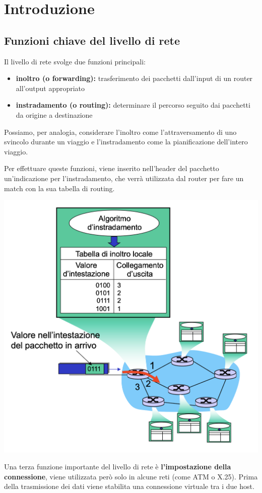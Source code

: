 \documentclass{report}
\begin{document}
	\hypertarget{header-n0}{%
\section{Introduzione}\label{header-n0}}

\hypertarget{header-n2}{%
\subsection{Funzioni chiave del livello di rete}\label{header-n2}}

Il livello di rete svolge due funzioni principali:

\begin{itemize}
\item
  \textbf{inoltro (o forwarding):} trasferimento dei pacchetti
  dall'input di un router all'output appropriato
\item
  \textbf{instradamento (o routing):} determinare il percorso seguito
  dai pacchetti da origine a destinazione
\end{itemize}

Possiamo, per analogia, considerare l'inoltro come l'attraversamento di
uno svincolo durante un viaggio e l'instradamento come la pianificazione
dell'intero viaggio.

Per effettuare queste funzioni, viene inserito nell'header del pacchetto
un'indicazione per l'instradamento, che verrà utilizzata dal router per
fare un match con la sua tabella di routing.

\begin{center}
		\includegraphics[width=0.5\linewidth]{instradamento}
	\end{center}

Una terza funzione importante del livello di rete è
\textbf{l'impostazione della connessione}, viene utilizzata però solo in
alcune reti (come ATM o X.25). Prima della trasmissione dei dati viene
stabilita una connessione virtuale tra i due host.
\end{document}
